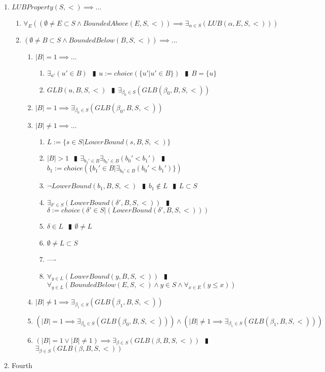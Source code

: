 \documentclass{book}
\newcommand{\rf}[1]{#1}
\newcommand{\abr}{:=}
\newcommand{\pipe}{$\phantom{(}\vrectangleblack\phantom{)}$}
\newcommand{\pr}[1]{\left(#1\right)}
\begin{document}
\begin{enumerate}
  \item $\rf{LUBProperty}(S, <) \implies \ldots$
  \begin{enumerate}
    \item $\forall_{E}\pr{\pr{\emptyset \neq E \subset S \land \rf{BoundedAbove}(E, S, <)} \implies \exists_{\alpha \in S}\pr{\rf{LUB}(\alpha, E, S, <)}}$
    \item $(\emptyset \neq B \subset S \land \rf{BoundedBelow}(B, S, <)) \implies \ldots$
    \begin{enumerate}
      \item $|B| = 1 \implies \ldots$
      \begin{enumerate}
        \item $\exists_{u'}(u' \in B)$ \pipe $u \abr choice(\{u' | u' \in B\})$ \pipe $B = \{u\}$
        \item $\rf{GLB}(u, B, S, <)$ \pipe $\exists_{\beta_0 \in S}\pr{\rf{GLB}(\beta_0, B, S, <)}$
      \end{enumerate}
      \item $|B| = 1 \implies \exists_{\beta_0 \in S}\pr{\rf{GLB}(\beta_0, B, S, <)}$
      \item $|B| \neq 1 \implies \ldots$
      \begin{enumerate}
      	\item $L \abr \{s \in S | \rf{LowerBound}(s, B, S, <)\}$
        \item $|B| > 1$ \pipe $\exists_{{b_1}' \in B} \exists_{{b_0}' \in B}({b_0}' < {b_1}')$ \pipe $b_1 \abr choice\pr{\{{b_1}' \in B | \exists_{{b_0}' \in B}({b_0}' < {b_1}')\}}$
        \item $\lnot LowerBound(b_1, B, S, <)$ \pipe $b_1 \notin L$ \pipe $L \subset S$
        \item $\exists_{\delta' \in S}\pr{LowerBound(\delta', B, S, <)}$ \pipe $\delta \abr choice\pr{\delta' \in S | \pr{LowerBound(\delta', B, S, <)}}$
        \item $\delta \in L$ \pipe $\emptyset \neq L$
        \item $\emptyset \neq L \subset S$
        \item ----
        \item $\forall_{y \in L}\pr{LowerBound(y, B, S, <)}$ \pipe $\forall_{y \in L}\pr{\rf{BoundedBelow}(E, S, <) \land y \in S \land \forall_{x \in E}(y \leq x)}$
      \end{enumerate}
      \item $|B| \neq 1 \implies \exists_{\beta_1 \in S}\pr{\rf{GLB}(\beta_1, B, S, <)}$
	  \item $\pr{|B| = 1 \implies \exists_{\beta_0 \in S}\pr{\rf{GLB}(\beta_0, B, S, <)}} \land \pr{|B| \neq 1 \implies \exists_{\beta_1 \in S}\pr{\rf{GLB}(\beta_1, B, S, <)}}$
	  \item $(|B| = 1 \lor |B| \neq 1) \implies \exists_{\beta \in S}\pr{\rf{GLB}(\beta, B, S, <)}$ \pipe $\exists_{\beta \in S}\pr{\rf{GLB}(\beta, B, S, <)}$
    \end{enumerate}
  \end{enumerate}
  \item Fourth
\end{enumerate}
\end{document}
